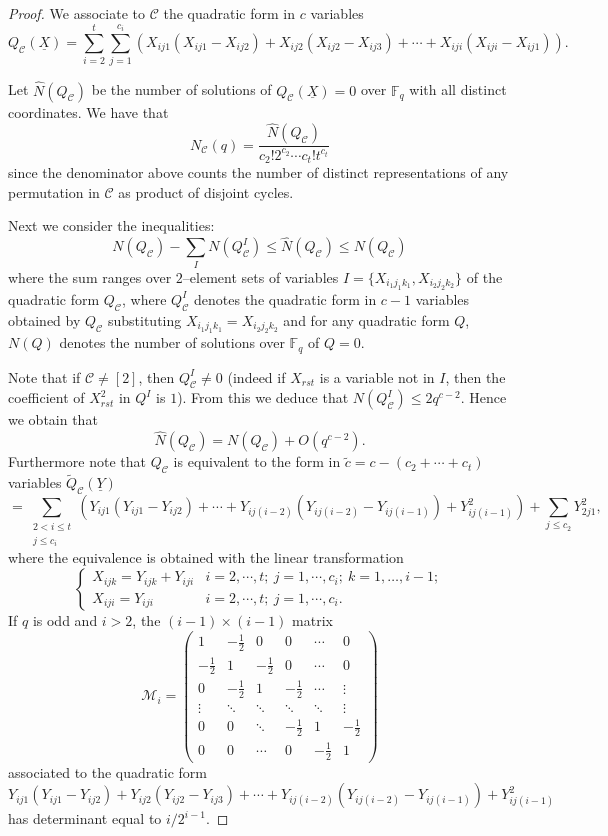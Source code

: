 \documentclass{amsart}
\newcommand{\F}{\mathbb F_q}
\begin{document}
\begin{proof} We associate to $\mathcal C$ the quadratic form in $c$
variables
$$Q_\mathcal
C(\underline{X})=\sum_{i=2}^t\sum_{j=1}^{c_i}
\left(X_{ij1}(X_{ij1}-X_{ij2})+
 X_{ij2}(X_{ij2}-X_{ij3})+\cdots+X_{iji}(X_{iji}-X_{ij1})\right).
$$

Let $\hat{N}(Q_\mathcal C)$ be the number of solutions of
$Q_\mathcal C(\underline{X})=0$ over $\F$ with all distinct
coordinates. We have that
\begin{equation}\label{uno}
N_\mathcal{C}(q)=\frac{\hat{N}(Q_\mathcal C)}{c_2!2^{c_2}\cdots
c_t!t^{c_t}}\end{equation} since the denominator above counts the
number of distinct representations of any permutation in $\mathcal
C$ as product of disjoint cycles.

Next we consider the inequalities:
$$ N(Q_\mathcal C) -\sum_{I}N(Q^{I}_\mathcal C)\leq \hat{N}(Q_\mathcal C)\leq N(Q_\mathcal
C)$$ where the sum ranges over $2$--element sets of variables
$I=\{X_{i_1j_1k_1}, X_{i_2j_2k_2}\}$ of the quadratic form
$Q_\mathcal C$, where $Q^{I}_\mathcal C$ denotes the quadratic form
in $c-1$ variables obtained by $Q_\mathcal C$ substituting
$X_{i_1j_1k_1}=X_{i_2j_2k_2}$ and for any quadratic form $Q$, $N(Q)$
denotes the number of solutions over $\F$ of $Q=0$.

Note that if $\mathcal C\neq[2]$, then $Q^{I}_\mathcal C\neq0$
(indeed if $X_{rst}$ is a variable not in $I$, then the coefficient
of $X_{rst}^2$ in $Q^{I}$ is $1$). From this we deduce that
$N(Q^{I}_\mathcal C)\leq 2q^{c-2}$. Hence we obtain that
 \begin{equation}\label{due}
\hat{N}(Q_\mathcal C)=N(Q_\mathcal C)+O(q^{c-2}).
\end{equation}
Furthermore note that $Q_\mathcal C$ is equivalent to the form in
$\tilde{c}=c-(c_2+\cdots+c_t)$ variables $\tilde{Q}_\mathcal
C(\underline{Y})$
$$=\sum_{\substack{2< i\leq t\\ j\leq c_i}}
\left(Y_{ij1}(Y_{ij1}-Y_{ij2})+
\cdots+Y_{ij(i-2)}(Y_{ij(i-2)}-Y_{ij(i-1)})+Y_{ij(i-1)}^2\right)+\sum_{j\leq
c_2}Y_{2j1}^2,$$ where the equivalence is obtained with the linear
transformation
$$\begin{cases}X_{ijk}=Y_{ijk}+Y_{iji} & i=2,\cdots,t;\ j=1,\cdots,c_i;\ k=1,\ldots,i-1;\\
X_{iji}=Y_{iji} &i=2,\cdots,t;\ j=1,\cdots,c_i.\end{cases}$$ If $q$
is odd and $i>2$, the $(i-1)\times(i-1)$ matrix
$$\mathcal M_i=\left(\begin{array}{rrrrrr}
1& -\frac12 & 0 & 0& \cdots & 0\\
-\frac12& 1 & -\frac12 & 0 & \cdots & 0\\
0 & -\frac12 & 1 & -\frac12 &\cdots &\vdots\\
\vdots & \ddots& \ddots & \ddots& \ddots&\vdots\\
0 & 0 &\ddots & -\frac12 & 1 & -\frac12\\
0& 0& \cdots & 0 &-\frac12 & 1
\end{array}\right)$$
associated to the quadratic form $$Y_{ij1}(Y_{ij1}-Y_{ij2})+
Y_{ij2}(Y_{ij2}-Y_{ij3})+\cdots+Y_{ij(i-2)}(Y_{ij(i-2)}-Y_{ij(i-1)})+Y_{ij(i-1)}^2$$
has determinant equal to $i/2^{i-1}$.


\end{proof}
\end{document}

